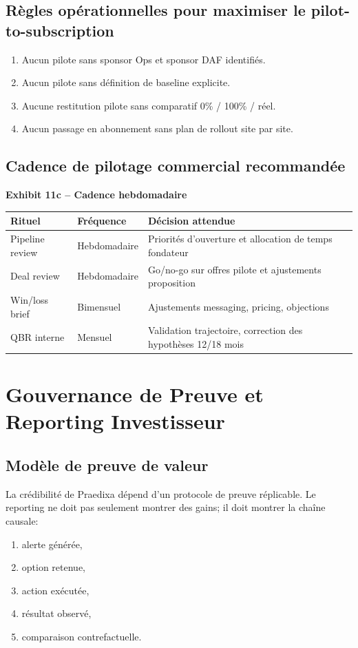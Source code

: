 \documentclass[11pt,a4paper]{article}
\newcommand{\exhibit}[1]{\vspace{2mm}\noindent\colorbox{PraedixaLight}{\parbox{\dimexpr\linewidth-2\fboxsep\relax}{\textbf{#1}}}\vspace{1mm}}
\begin{document}
\subsection{Règles opérationnelles pour maximiser le pilot-to-subscription}
\begin{enumerate}
  \item Aucun pilote sans sponsor Ops et sponsor DAF identifiés.
  \item Aucun pilote sans définition de baseline explicite.
  \item Aucune restitution pilote sans comparatif 0\% / 100\% / réel.
  \item Aucun passage en abonnement sans plan de rollout site par site.
\end{enumerate}

\subsection{Cadence de pilotage commercial recommandée}
\exhibit{Exhibit 11c -- Cadence hebdomadaire}
\begin{tabularx}{\linewidth}{@{}l l X@{}}
\toprule
\textbf{Rituel} & \textbf{Fréquence} & \textbf{Décision attendue} \\
\midrule
Pipeline review & Hebdomadaire & Priorités d'ouverture et allocation de temps fondateur \\
Deal review & Hebdomadaire & Go/no-go sur offres pilote et ajustements proposition \\
Win/loss brief & Bimensuel & Ajustements messaging, pricing, objections \\
QBR interne & Mensuel & Validation trajectoire, correction des hypothèses 12/18 mois \\
\bottomrule
\end{tabularx}

\section{Gouvernance de Preuve et Reporting Investisseur}
\subsection{Modèle de preuve de valeur}
La crédibilité de Praedixa dépend d'un protocole de preuve réplicable. Le reporting ne doit pas seulement montrer des gains; il doit montrer la chaîne causale:
\begin{enumerate}
  \item alerte générée,
  \item option retenue,
  \item action exécutée,
  \item résultat observé,
  \item comparaison contrefactuelle.
\end{enumerate}
\end{document}

